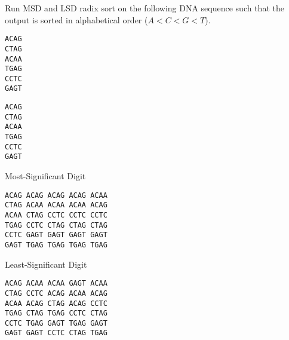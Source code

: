 \begin{blocksection}
\question Run MSD and LSD radix sort on the following DNA sequence such that
the output is sorted in alphabetical order ($A < C < G < T$).

\ifprintanswers\else
\begin{verbatim}
ACAG
CTAG
ACAA
TGAG
CCTC
GAGT
\end{verbatim}

\begin{verbatim}
ACAG
CTAG
ACAA
TGAG
CCTC
GAGT
\end{verbatim}
\fi

\begin{solution}
Most-Significant Digit
\begin{verbatim}
ACAG ACAG ACAG ACAG ACAA
CTAG ACAA ACAA ACAA ACAG
ACAA CTAG CCTC CCTC CCTC
TGAG CCTC CTAG CTAG CTAG
CCTC GAGT GAGT GAGT GAGT
GAGT TGAG TGAG TGAG TGAG
\end{verbatim}

Least-Significant Digit
\begin{verbatim}
ACAG ACAA ACAA GAGT ACAA
CTAG CCTC ACAG ACAA ACAG
ACAA ACAG CTAG ACAG CCTC
TGAG CTAG TGAG CCTC CTAG
CCTC TGAG GAGT TGAG GAGT
GAGT GAGT CCTC CTAG TGAG
\end{verbatim}
\end{solution}

\vspace{\parskip}
\end{blocksection}

